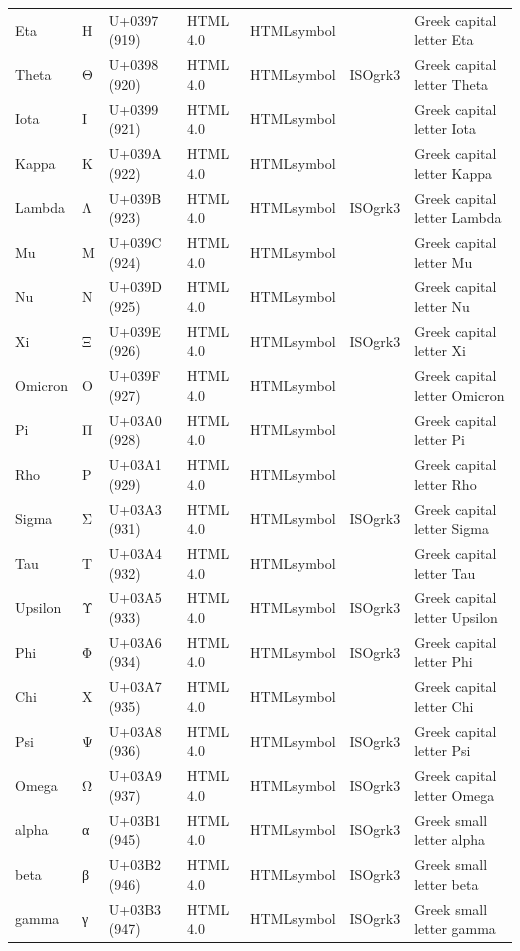 \documentclass{article}
\begin{document}
\begin{tabular}{lllllll}
Eta & Η & U+0397 (919) & HTML 4.0 & HTMLsymbol &  & Greek capital letter Eta \\
Theta & Θ & U+0398 (920) & HTML 4.0 & HTMLsymbol & ISOgrk3 & Greek capital letter Theta \\
Iota & Ι & U+0399 (921) & HTML 4.0 & HTMLsymbol &  & Greek capital letter Iota \\
Kappa & Κ & U+039A (922) & HTML 4.0 & HTMLsymbol &  & Greek capital letter Kappa \\
Lambda & Λ & U+039B (923) & HTML 4.0 & HTMLsymbol & ISOgrk3 & Greek capital letter Lambda \\
Mu & Μ & U+039C (924) & HTML 4.0 & HTMLsymbol &  & Greek capital letter Mu \\
Nu & Ν & U+039D (925) & HTML 4.0 & HTMLsymbol &  & Greek capital letter Nu \\
Xi & Ξ & U+039E (926) & HTML 4.0 & HTMLsymbol & ISOgrk3 & Greek capital letter Xi \\
Omicron & Ο & U+039F (927) & HTML 4.0 & HTMLsymbol &  & Greek capital letter Omicron \\
Pi & Π & U+03A0 (928) & HTML 4.0 & HTMLsymbol &  & Greek capital letter Pi \\
Rho & Ρ & U+03A1 (929) & HTML 4.0 & HTMLsymbol &  & Greek capital letter Rho \\
Sigma & Σ & U+03A3 (931) & HTML 4.0 & HTMLsymbol & ISOgrk3 & Greek capital letter Sigma \\
Tau & Τ & U+03A4 (932) & HTML 4.0 & HTMLsymbol &  & Greek capital letter Tau \\
Upsilon & Υ & U+03A5 (933) & HTML 4.0 & HTMLsymbol & ISOgrk3 & Greek capital letter Upsilon \\
Phi & Φ & U+03A6 (934) & HTML 4.0 & HTMLsymbol & ISOgrk3 & Greek capital letter Phi \\
Chi & Χ & U+03A7 (935) & HTML 4.0 & HTMLsymbol &  & Greek capital letter Chi \\
Psi & Ψ & U+03A8 (936) & HTML 4.0 & HTMLsymbol & ISOgrk3 & Greek capital letter Psi \\
Omega & Ω & U+03A9 (937) & HTML 4.0 & HTMLsymbol & ISOgrk3 & Greek capital letter Omega \\
alpha & α & U+03B1 (945) & HTML 4.0 & HTMLsymbol & ISOgrk3 & Greek small letter alpha \\
beta & β & U+03B2 (946) & HTML 4.0 & HTMLsymbol & ISOgrk3 & Greek small letter beta \\
gamma & γ & U+03B3 (947) & HTML 4.0 & HTMLsymbol & ISOgrk3 & Greek small letter gamma \\

\end{tabular}
\end{document}
